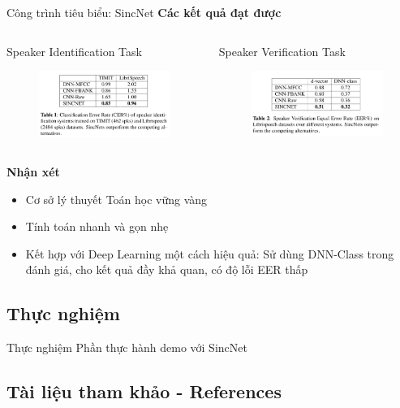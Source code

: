 \documentclass[notheorems, aspectratio=54]{beamer}
\begin{document}
\begin{frame}{Công trình tiêu biểu: SincNet}
	\textbf{Các kết quả đạt được}\newline
	\begin{columns}
		\begin{column}{0.5\textwidth}
			Speaker Identification Task
			\begin{figure}[H]
				\includegraphics[width=1\linewidth]{images/performance_speaker_identification.png}
			\end{figure}
		\end{column}
		\begin{column}{0.5\textwidth}
			Speaker Verification Task
			\begin{figure}[H]
				\includegraphics[width=1\linewidth]{images/performance_speaker_verification.png}
			\end{figure}
		\end{column}
	\end{columns}
	\textbf{Nhận xét}
	\begin{itemize}
		\item Cơ sở lý thuyết Toán học vững vàng
		\item Tính toán nhanh và gọn nhẹ
		\item Kết hợp với Deep Learning một cách hiệu quả: Sử dùng DNN-Class trong đánh giá, cho kết quả đầy khả quan, có độ lỗi EER thấp
	\end{itemize}
\end{frame}
\subsection{Thực nghiệm}
\begin{frame}{Thực nghiệm}
	\huge Phần thực hành demo với SincNet
\end{frame}
\subsection{Tài liệu tham khảo - References}
\begin{frame}
	\nocite{*}
	\newpage\cleardoublepage
	
\end{frame}
\end{document}
